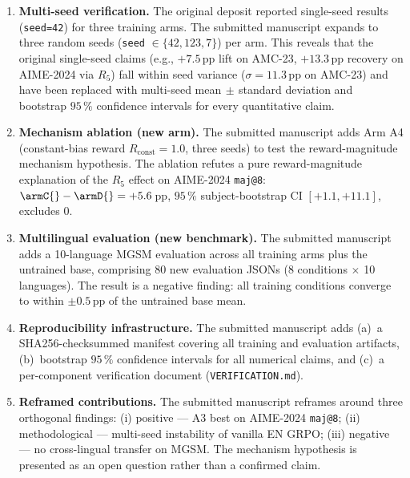 \documentclass[11pt]{article}
\begin{document}
\begin{enumerate}[itemsep=4pt]

\item \textbf{Multi-seed verification.}
The original deposit reported single-seed results (\texttt{seed=42})
for three training arms. The submitted manuscript expands to three
random seeds (\texttt{seed} $\in \{42, 123, 7\}$) per arm. This
reveals that the original single-seed claims (e.g., $+7.5$\,pp lift
on AMC-23, $+13.3$\,pp recovery on AIME-2024 via $R_5$) fall within
seed variance ($\sigma = 11.3$\,pp on AMC-23) and have been replaced
with multi-seed mean$\,\pm\,$standard deviation and bootstrap
$95\,\%$ confidence intervals for every quantitative claim.

\item \textbf{Mechanism ablation (new arm).}
The submitted manuscript adds Arm A4 (constant-bias reward
$R_{\text{const}}=1.0$, three seeds) to test the reward-magnitude
mechanism hypothesis. The ablation refutes a pure reward-magnitude
explanation of the $R_5$ effect on AIME-2024 \texttt{maj@8}:
$\armC{}-\armD{} = +5.6$\,pp, $95\,\%$ subject-bootstrap CI
$[+1.1, +11.1]$, excludes $0$.

\item \textbf{Multilingual evaluation (new benchmark).}
The submitted manuscript adds a 10-language MGSM evaluation across all
training arms plus the untrained base, comprising 80 new evaluation
JSONs (8 conditions $\times$ 10 languages). The result is a negative
finding: all training conditions converge to within $\pm 0.5$\,pp of
the untrained base mean.

\item \textbf{Reproducibility infrastructure.}
The submitted manuscript adds (a)~a SHA256-checksummed manifest
covering all training and evaluation artifacts, (b)~bootstrap
$95\,\%$ confidence intervals for all numerical claims, and (c)~a
per-component verification document (\texttt{VERIFICATION.md}).

\item \textbf{Reframed contributions.}
The submitted manuscript reframes around three orthogonal findings:
(i) positive --- A3 best on AIME-2024 \texttt{maj@8};
(ii) methodological --- multi-seed instability of vanilla EN GRPO;
(iii) negative --- no cross-lingual transfer on MGSM. The mechanism
hypothesis is presented as an open question rather than a confirmed
claim.

\end{enumerate}
\end{document}
